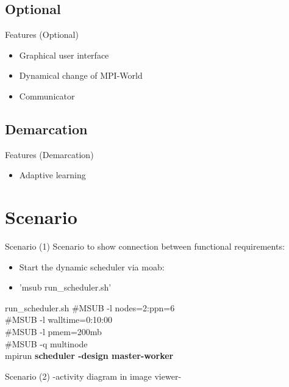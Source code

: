 \documentclass[18pt]{beamer}
\begin{document}
	\subsection{Optional}
	\begin{frame}{Features (Optional)}
		\begin{itemize}
			\pause
			\item Graphical user interface			
			\pause
			\item Dynamical change of MPI-World
			\pause
			\item Communicator
		\end{itemize}
	\end{frame}
	
	\subsection{Demarcation}
	\begin{frame}{Features (Demarcation)}
		\begin{itemize}
			\pause
			\item Adaptive learning
		\end{itemize}
	\end{frame}

\section{Scenario}
	\begin{frame}{Scenario (1)}
		Scenario to show connection between functional requirements:
		\pause
		\begin{itemize}
			\item Start the dynamic scheduler via moab:
			\item 'msub run\_scheduler.sh'
		\end{itemize}
		\begin{block}{run\_scheduler.sh}
			\#MSUB -l nodes=2:ppn=6 \\
			\#MSUB -l walltime=0:10:00 \\
			\#MSUB -l pmem=200mb \\
			\#MSUB -q multinode \\
			mpirun \textbf{scheduler -design master-worker}
		\end{block}
	\end{frame}
	\begin{frame}{Scenario (2)}
		\center -activity diagram in image viewer-
	\end{frame}
\end{document}
